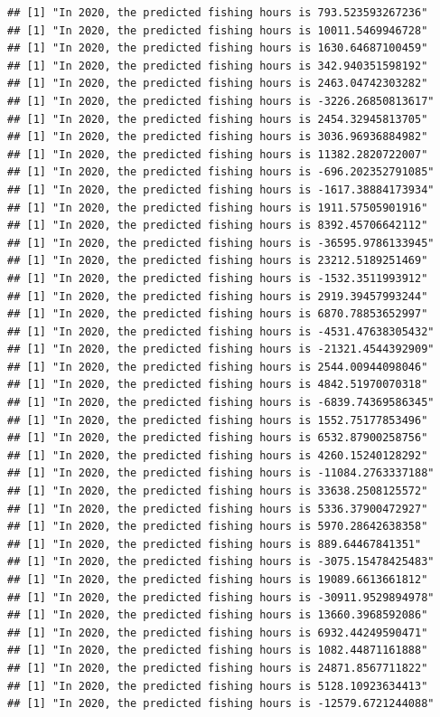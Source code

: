 \documentclass[
]{article}
\begin{document}
\begin{verbatim}
## [1] "In 2020, the predicted fishing hours is 793.523593267236"
## [1] "In 2020, the predicted fishing hours is 10011.5469946728"
## [1] "In 2020, the predicted fishing hours is 1630.64687100459"
## [1] "In 2020, the predicted fishing hours is 342.940351598192"
## [1] "In 2020, the predicted fishing hours is 2463.04742303282"
## [1] "In 2020, the predicted fishing hours is -3226.26850813617"
## [1] "In 2020, the predicted fishing hours is 2454.32945813705"
## [1] "In 2020, the predicted fishing hours is 3036.96936884982"
## [1] "In 2020, the predicted fishing hours is 11382.2820722007"
## [1] "In 2020, the predicted fishing hours is -696.202352791085"
## [1] "In 2020, the predicted fishing hours is -1617.38884173934"
## [1] "In 2020, the predicted fishing hours is 1911.57505901916"
## [1] "In 2020, the predicted fishing hours is 8392.45706642112"
## [1] "In 2020, the predicted fishing hours is -36595.9786133945"
## [1] "In 2020, the predicted fishing hours is 23212.5189251469"
## [1] "In 2020, the predicted fishing hours is -1532.3511993912"
## [1] "In 2020, the predicted fishing hours is 2919.39457993244"
## [1] "In 2020, the predicted fishing hours is 6870.78853652997"
## [1] "In 2020, the predicted fishing hours is -4531.47638305432"
## [1] "In 2020, the predicted fishing hours is -21321.4544392909"
## [1] "In 2020, the predicted fishing hours is 2544.00944098046"
## [1] "In 2020, the predicted fishing hours is 4842.51970070318"
## [1] "In 2020, the predicted fishing hours is -6839.74369586345"
## [1] "In 2020, the predicted fishing hours is 1552.75177853496"
## [1] "In 2020, the predicted fishing hours is 6532.87900258756"
## [1] "In 2020, the predicted fishing hours is 4260.15240128292"
## [1] "In 2020, the predicted fishing hours is -11084.2763337188"
## [1] "In 2020, the predicted fishing hours is 33638.2508125572"
## [1] "In 2020, the predicted fishing hours is 5336.37900472927"
## [1] "In 2020, the predicted fishing hours is 5970.28642638358"
## [1] "In 2020, the predicted fishing hours is 889.64467841351"
## [1] "In 2020, the predicted fishing hours is -3075.15478425483"
## [1] "In 2020, the predicted fishing hours is 19089.6613661812"
## [1] "In 2020, the predicted fishing hours is -30911.9529894978"
## [1] "In 2020, the predicted fishing hours is 13660.3968592086"
## [1] "In 2020, the predicted fishing hours is 6932.44249590471"
## [1] "In 2020, the predicted fishing hours is 1082.44871161888"
## [1] "In 2020, the predicted fishing hours is 24871.8567711822"
## [1] "In 2020, the predicted fishing hours is 5128.10923634413"
## [1] "In 2020, the predicted fishing hours is -12579.6721244088"

\end{verbatim}
\end{document}
